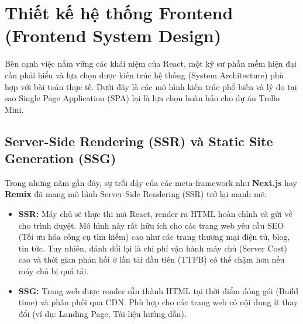 \section{Thiết kế hệ thống Frontend (Frontend System Design)}
Bên cạnh việc nắm vững các khái niệm của React, một kỹ sư phần mềm hiện đại cần phải hiểu và lựa chọn được kiến trúc hệ thống (System Architecture) phù hợp với bài toán thực tế. Dưới đây là các mô hình kiến trúc phổ biến và lý do tại sao Single Page Application (SPA) lại là lựa chọn hoàn hảo cho dự án Trello Mini.

\subsection{Server-Side Rendering (SSR) và Static Site Generation (SSG)}
Trong những năm gần đây, sự trỗi dậy của các meta-framework như \textbf{Next.js} hay \textbf{Remix} đã mang mô hình Server-Side Rendering (SSR) trở lại mạnh mẽ.
\begin{itemize}
    \item \textbf{SSR:} Máy chủ sẽ thực thi mã React, render ra HTML hoàn chỉnh và gửi về cho trình duyệt. Mô hình này rất hữu ích cho các trang web yêu cầu SEO (Tối ưu hóa công cụ tìm kiếm) cao như các trang thương mại điện tử, blog, tin tức. Tuy nhiên, đánh đổi lại là chi phí vận hành máy chủ (Server Cost) cao và thời gian phản hồi ở lần tải đầu tiên (TTFB) có thể chậm hơn nếu máy chủ bị quá tải.
    \item \textbf{SSG:} Trang web được render sẵn thành HTML tại thời điểm đóng gói (Build time) và phân phối qua CDN. Phù hợp cho các trang web có nội dung ít thay đổi (ví dụ: Landing Page, Tài liệu hướng dẫn).
\end{itemize}

